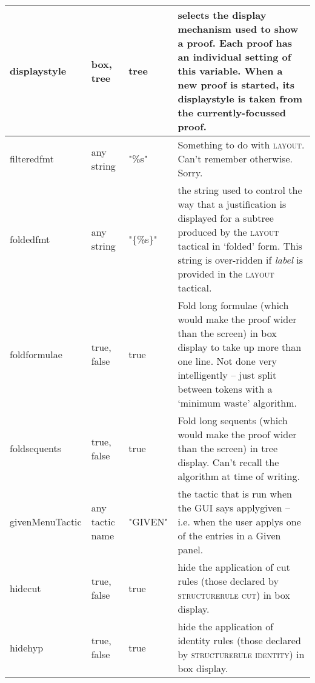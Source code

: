 \begin{longtable}{|l|p{2cm}|l|p{2.5in}|}
{\raggedright displaystyle} & {\raggedright box, tree} & {\raggedright tree} & {\raggedright selects the display mechanism used to show a proof. Each proof has an individual setting of this variable. When a new proof is started, its displaystyle is taken from the currently-focussed proof.}\\
\hline

filteredfmt & any string & "\%s" & Something to do with \textsc{layout}. Can't remember otherwise. Sorry.\\ \hline

{\raggedright foldedfmt} & {\raggedright any string} & {\raggedright "\{\%s\}"} & {\raggedright the string used to control the way that a justification is displayed for a subtree produced by the \textsc{layout} tactical in `folded' form. This string is over-ridden if \textit{label} is provided in the \textsc{layout} tactical.}\\
\hline

foldformulae & true, false & true & Fold long formulae (which would make the proof wider than the screen) in box display to take up more than one line. Not done very intelligently -- just split between tokens with a `minimum waste' algorithm.\\ \hline

foldsequents & true, false & true & Fold long sequents (which would make the proof wider than the screen) in tree display. Can't recall the algorithm at time of writing.\\ \hline


givenMenuTactic & \raggedright{any tactic name} & "GIVEN" & the tactic that is run when the GUI says applygiven -- i.e. when the user applys one of the entries in a Given panel.\\ \hline

hidecut & {\raggedright true, false} & {\raggedright true} & {\raggedright hide the application of cut rules (those declared by \textsc{structurerule cut}) in box display.}\\
\hline

hidehyp & {\raggedright true, false} & {\raggedright true} & hide the application of identity rules (those declared by \textsc{structurerule identity}) in box display.\\
\hline


\end{longtable}
